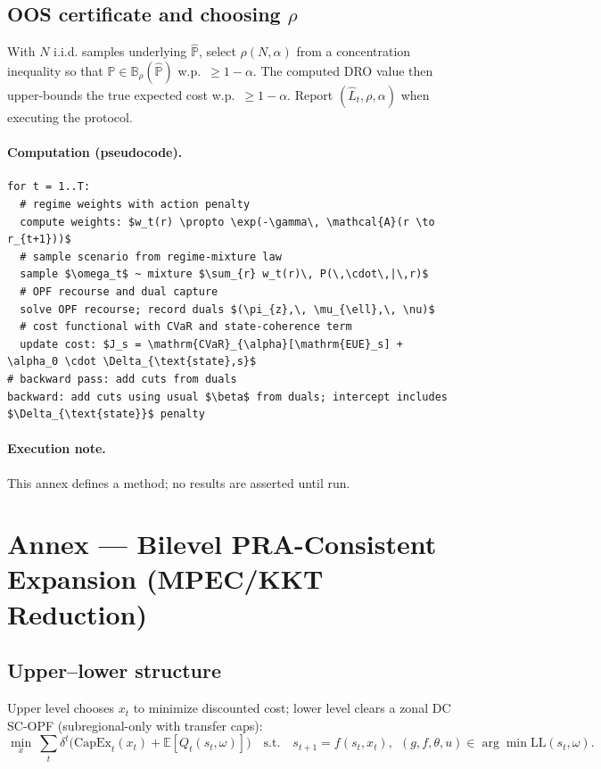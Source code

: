 \documentclass[11pt]{article}
\newcommand{\annexsection}[1]{\section{Annex \thesection{} — #1}}
\numberwithin{equation}{section}
\theoremstyle{definition}
\theoremstyle{remark}
\begin{document}
\subsection{OOS certificate and choosing \texorpdfstring{$\rho$}{rho}}

With $N$ i.i.d. samples underlying $\widehat{\mathbb{P}}$, select $\rho(N,\alpha)$ from a concentration inequality so that $\mathbb{P}\in\mathbb{B}_\rho(\widehat{\mathbb{P}})$ w.p.\ $\ge 1-\alpha$. The computed DRO value then upper-bounds the true expected cost w.p.\ $\ge 1-\alpha$. Report $(\widehat L_t,\rho,\alpha)$ when executing the protocol.

\paragraph{Computation (pseudocode).}
\begin{lstlisting}[style=annexpseudo,caption={Quantum-inspired regime reweighting},label={lst:qsd}]
for t = 1..T:
  # regime weights with action penalty
  compute weights: $w_t(r) \propto \exp(-\gamma\, \mathcal{A}(r \to r_{t+1}))$
  # sample scenario from regime-mixture law
  sample $\omega_t$ ~ mixture $\sum_{r} w_t(r)\, P(\,\cdot\,|\,r)$
  # OPF recourse and dual capture
  solve OPF recourse; record duals $(\pi_{z},\, \mu_{\ell},\, \nu)$
  # cost functional with CVaR and state-coherence term
  update cost: $J_s = \mathrm{CVaR}_{\alpha}[\mathrm{EUE}_s] + \alpha_0 \cdot \Delta_{\text{state},s}$
# backward pass: add cuts from duals
backward: add cuts using usual $\beta$ from duals; intercept includes $\Delta_{\text{state}}$ penalty
\end{lstlisting}

\paragraph{Execution note.} This annex defines a method; no results are asserted until run.

\annexsection{Bilevel PRA-Consistent Expansion (MPEC/KKT Reduction)}
\label{annex:Q}

\subsection{ Upper–lower structure}
Upper level chooses $x_t$ to minimize discounted cost; lower level clears a zonal DC SC-OPF (subregional-only with transfer caps):
\[
\min_{x}\ \sum_t \delta^{t}\!\big(\mathrm{CapEx}_t(x_t) + \mathbb{E}[Q_t(s_t,\omega)]\big)
\quad\text{s.t.}\quad s_{t+1}=f(s_t,x_t),\ \ (g,f,\theta,u)\in\arg\min\mathrm{LL}(s_t,\omega).
\]
\end{document}
